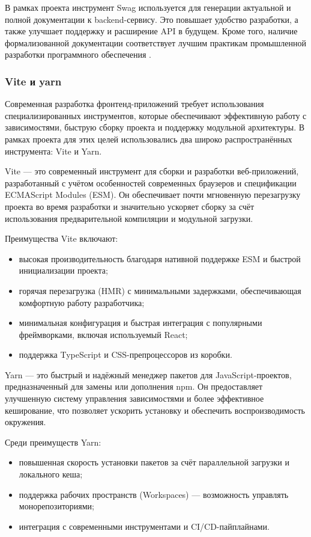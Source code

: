 \documentclass[diploma]{SCWorks}
\begin{document}
В рамках проекта инструмент Swag используется для генерации 
актуальной и полной документации к backend-сервису. Это повышает удобство 
разработки, а также улучшает поддержку и расширение API в будущем. Кроме того, 
наличие формализованной документации соответствует лучшим практикам 
промышленной разработки программного обеспечения \cite{swag}.

\subsubsection{Vite и yarn}

Современная разработка фронтенд-приложений требует использования 
специализированных инструментов, которые обеспечивают эффективную работу с 
зависимостями, быструю сборку проекта и поддержку модульной архитектуры. 
В рамках проекта для этих целей использовались два широко 
распространённых инструмента: Vite и Yarn.

Vite — это современный инструмент для сборки и разработки веб-приложений, 
разработанный с учётом особенностей современных браузеров и спецификации 
ECMAScript Modules (ESM). Он обеспечивает почти мгновенную перезагрузку 
проекта во время разработки и значительно ускоряет сборку за счёт 
использования предварительной компиляции и модульной загрузки.

Преимущества Vite включают:
\begin{itemize}
    \item высокая производительность благодаря нативной поддержке ESM и 
    быстрой инициализации проекта;
    \item горячая перезагрузка (HMR) с минимальными задержками, обеспечивающая 
    комфортную работу разработчика;
    \item минимальная конфигурация и быстрая интеграция с 
    популярными фреймворками, включая используемый React;
    \item поддержка TypeScript и CSS-препроцессоров из коробки.
\end{itemize}

Yarn — это быстрый и надёжный менеджер пакетов для JavaScript-проектов, 
предназначенный для замены или дополнения npm. Он предоставляет улучшенную 
систему управления зависимостями и более эффективное кеширование, что 
позволяет ускорить установку и обеспечить воспроизводимость окружения.

Среди преимуществ Yarn:
\begin{itemize}
    \item повышенная скорость установки пакетов за счёт параллельной загрузки 
    и локального кеша;
    \item поддержка рабочих пространств (Workspaces) — возможность управлять 
    монорепозиториями;
    \item интеграция с современными инструментами и CI/CD-пайплайнами.
\end{itemize}
\end{document}
